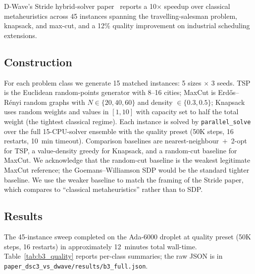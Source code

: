 \documentclass[11pt,a4paper]{article}
\begin{document}
\medskip
D-Wave's Stride hybrid-solver paper~\cite{booth_stride_2024} reports a 10$\times$
speedup over classical metaheuristics across 45 instances spanning the
travelling-salesman problem, knapsack, and max-cut, and a 12\% quality
improvement on industrial scheduling extensions.

\subsection{Construction}

For each problem class we generate 15 matched instances: 5 sizes $\times$ 3
seeds. TSP is the Euclidean random-points generator with 8--16 cities;
MaxCut is Erdős--R\'enyi random graphs with $N\!\in\!\{20,40,60\}$ and
density $\in\!\{0.3,0.5\}$; Knapsack uses random weights and values
in $[1,10]$ with capacity set to half the total weight (the tightest
classical regime). Each instance is solved by \texttt{parallel\_solve} over
the full 15-CPU-solver ensemble with the quality preset (50K steps,
16 restarts, 10~min timeout). Comparison baselines are
nearest-neighbour~$+$~2-opt for TSP, a value-density greedy for Knapsack,
and a random-cut baseline for MaxCut. We acknowledge that the random-cut
baseline is the weakest legitimate MaxCut reference; the Goemans--Williamson
SDP would be the standard tighter baseline. We use the weaker baseline
to match the framing of the Stride paper, which compares to ``classical
metaheuristics'' rather than to SDP.

\subsection{Results}

The 45-instance sweep completed on the Ada-6000 droplet at quality preset
(50K steps, 16 restarts) in approximately 12~minutes total wall-time.
Table~\ref{tab:b3_quality} reports per-class summaries; the raw JSON is
in \texttt{paper\_dsc3\_vs\_dwave/results/b3\_full.json}.
\end{document}
